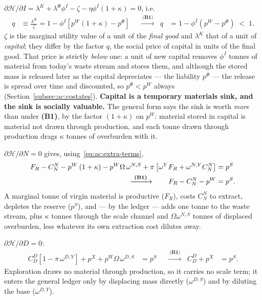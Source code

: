  $\partial\mathcal H/\partial I=\lambda^K+\lambda^\Phi\phi^I-\zeta-\eta\phi^I\left(1+\kappa\right)=0$, i.e.
\begin{align}
q &\equiv \frac{\lambda^K}{\zeta}=1-\phi^I\left[p^W\left(1+\kappa\right)-p^\Phi\right]
&&\xrightarrow{\ \textbf{(B1)}\ }
&
q &= 1-\phi^I\left(p^W-p^\Phi\right)\;<\;1.
\label{eq:ac:foc-investment}
\end{align}
$\zeta$ is the marginal utility value of a unit of the \emph{final good} and $\lambda^K$ that of a unit of \emph{capital}; they differ by the factor $q$, the social price of capital in units of the final good. That price is strictly \emph{below} one: a unit of new capital removes $\phi^I$ tonnes of material from today's waste stream and stores them, and although the stored mass is released later as the capital depreciates --- the liability $p^\Phi$ --- the release is spread over time and discounted, so $p^\Phi<p^W$ always (Section~\ref{subsec:ac:costates}). \textbf{Capital is a temporary materials sink, and the sink is socially valuable.} The general form says the sink is worth \emph{more} than under \textbf{(B1)}, by the factor $\left(1+\kappa\right)$ on $p^W$: material stored in capital is material not drawn through production, and each tonne drawn through production drags $\kappa$ tonnes of overburden with it.

 $\partial\mathcal H/\partial N=0$ gives, using~\eqref{eq:ac:extra-terms},
\begin{align}
F_R-C^N_N-p^W\left(1+\kappa\right)-p^W\Omega\,\omega^{N,S}+\pi\left[\omega^YF_R+\omega^{N,Y}C^N_N\right] &= p^S
\label{eq:ac:foc-extraction}
\\
\xrightarrow{\ \textbf{(B1)}\ }\qquad
F_R-C^N_N-p^W &= p^S.
\notag
\end{align}
A marginal tonne of virgin material is productive ($F_R$), costs $C^N_N$ to extract, depletes the reserve ($p^S$), and --- by the ledger --- adds one tonne to the waste stream, plus $\kappa$ tonnes through the scale channel and $\Omega\omega^{N,S}$ tonnes of displaced overburden, less whatever its own extraction cost dilutes away.

 $\partial\mathcal H/\partial D=0$:
\begin{align}
C^D_D\left[1-\pi\,\omega^{D,Y}\right]+p^X+p^W\Omega\,\omega^{D,S} &= p^S
&&\xrightarrow{\ \textbf{(B1)}\ }
&
C^D_D+p^X &= p^S.
\label{eq:ac:foc-exploration}
\end{align}
Exploration draws no material through production, so it carries no scale term; it enters the general ledger only by displacing mass directly ($\omega^{D,S}$) and by diluting the base ($\omega^{D,Y}$).

